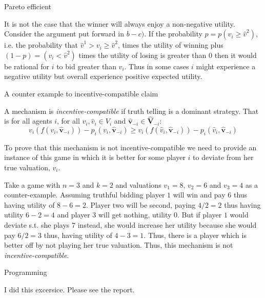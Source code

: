 \documentclass[12pt]{article}
\newenvironment{question}[2][Question]{\begin{trivlist}
\item[\hskip \labelsep {\bfseries #1}\hskip \labelsep {\bfseries #2.}]}{\end{trivlist}}
\newenvironment{answer}[2][Answer]{\begin{trivlist}
\item[\hskip \labelsep {\bfseries #1}\hskip \labelsep {\bfseries #2:}]}{\end{trivlist}}
\begin{document}
\begin{answer}{d)}{Pareto efficient}

It is not the case that the winner will always enjoy a non-negative utility. Consider the argument put forward in $b-c)$. If the probability $p=p(v_i\geq\hat{v}^2)$, i.e. the probability that $\hat{v}^1 > v_i \geq \hat{v}^2$, times the utility of winning plus $(1-p)=(v_i < \hat{v}^2)$ times the utility of losing is greater than $0$ then it would be rational for $i$ to bid greater than $v_i$. Thus in some cases $i$ might experience a negative utility but overall experience positive expected utility.
\end{answer}

\begin{question}{3}
A counter example to incentive-compatible claim
\end{question}
\begin{answer}{a)}

A mechanism is \textit{incentive-compatible} if truth telling is a dominant strategy. That is for all agents $i$, for all $v_i, \hat{v}_i \in V_i$ and $\boldsymbol{\hat{v}}_{-i} \in \boldsymbol{\hat{V}}_{-i}$:
$$v_i(f(v_i,\boldsymbol{\hat{v}}_{-i})) - p_i(v_i,\boldsymbol{\hat{v}}_{-i}) \geq v_i(f(\hat{v}_i,\boldsymbol{\hat{v}}_{-i})) - p_i(\hat{v}_i,\boldsymbol{\hat{v}}_{-i})$$

To prove that this mechanism is not incentive-compatible we need to provide an instance of this game in which it is better for some player $i$ to deviate from her true valuation, $v_i$.

Take a game with $n=3$ and $k=2$ and valuations $v_1=8$, $v_2=6$ and $v_3=4$ as a counter-example. Assuming truthful bidding player $1$ will win and pay $6$ thus having utility of $8-6=2$. Player two will be second, paying $4/2=2$ thus having utility $6-2=4$ and player $3$ will get nothing, utility $0$. But if player $1$ would deviate s.t. she plays $7$ instead, she would increase her utility because she would pay $6/2=3$ thus, having utility of $4-3=1$. Thus, there is a player which is better off by not playing her true valuation. Thus, this mechanism is not \textit{incentive-compatible}.
\end{answer}


\begin{question}{4}
Programming
\end{question}
\begin{answer}{a)}
I did this excersice. Please see the report.
\end{answer}
\end{document}
